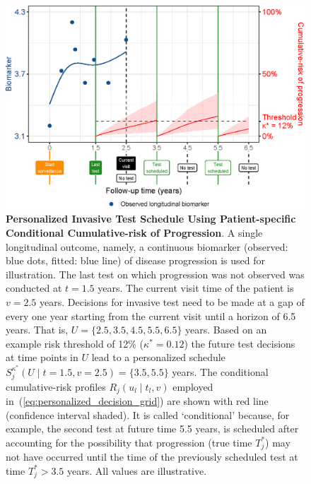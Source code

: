 \begin{figure}
\centerline{\includegraphics{images/schedule_explanation_102.eps}}
\caption{\textbf{Personalized Invasive Test Schedule Using Patient-specific Conditional Cumulative-risk of Progression}.  A single longitudinal outcome, namely, a continuous biomarker (observed: blue dots, fitted: blue line) of disease progression is used for illustration. The last test on which progression was not observed was conducted at $t=1.5$ years. The current visit time of the patient is $v=2.5$ years. Decisions for invasive test need to be made at a gap of every one year starting from the current visit until a horizon of 6.5 years. That is, $U=\{2.5, 3.5, 4.5, 5.5, 6.5\}$ years. Based on an example risk threshold of 12\% ($\kappa^*=0.12$) the future test decisions at time points in $U$ lead to a personalized schedule $S_j^{\kappa^*} (U \mid t=1.5, v=2.5) = \{3.5, 5.5\}$ years. The conditional cumulative-risk profiles $R_j(u_l \mid t_l, v)$ employed in~(\ref{eq:personalized_decision_grid}) are shown with red line (confidence interval shaded). It is called `conditional' because, for example, the second test at future time 5.5 years, is scheduled after accounting for the possibility that progression (true time $T^*_j$) may not have occurred until the time of the previously scheduled test at time $T^*_j>3.5$ years. All values are illustrative.} 
\label{fig:schedule_explanation}
\end{figure}

